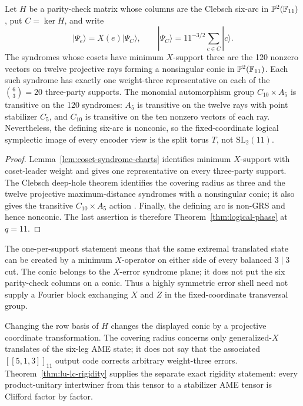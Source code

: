 \begin{proposition}
\label{prop:clebsch-x-syndrome}
Let \(H\) be a parity-check matrix whose columns are the Clebsch six-arc
in \(\mathbb P^2(\mathbb F_{11})\), put \(C=\ker H\), and write
\[
 |\Psi_e\rangle=X(e)|\Psi_C\rangle,
 \qquad
 |\Psi_C\rangle=11^{-3/2}\sum_{c\in C}|c\rangle .
\]
The syndromes whose cosets have minimum \(X\)-support three are the 120
nonzero vectors on twelve projective rays forming a nonsingular conic in
\(\mathbb P^2(\mathbb F_{11})\).  Each such syndrome has exactly one weight-three
representative on each of the \(\binom63=20\) three-party supports.  The
monomial automorphism group
\(C_{10}\times A_5\) is transitive on the 120 syndromes: \(A_5\) is
transitive on the twelve rays with point stabilizer \(C_5\), and
\(C_{10}\) is transitive on the ten nonzero vectors of each ray.
Nevertheless, the defining six-arc is nonconic, so the fixed-coordinate
logical symplectic image of every encoder view is the split torus \(T\),
not \(\mathrm{SL}_2(11)\).
\end{proposition}

\begin{proof}
Lemma~\ref{lem:coset-syndrome-charts} identifies minimum \(X\)-support
with coset-leader weight and gives one representative on every
three-party support.  The Clebsch deep-hole theorem identifies the covering
radius as three and the twelve projective maximum-distance syndromes with a
nonsingular conic; it also gives the transitive \(C_{10}\times A_5\) action
\cite[Proposition~6.2, Corollary~6.3, and Proposition~6.4]{RuddClebsch2026}.
Finally, the defining arc is non-GRS and hence nonconic.  The last assertion
is therefore Theorem~\ref{thm:logical-phase} at \(q=11\).
\end{proof}

\begin{remark}
\label{rem:clebsch-x-syndrome-boundary}
The one-per-support statement means that the same extremal translated state
can be created by a minimum \(X\)-operator on either side of every balanced
\(3\mid3\) cut.  The conic belongs to the \(X\)-error syndrome plane; it
does not put the six parity-check columns on a conic.  Thus a highly symmetric
error shell need not supply a Fourier block exchanging \(X\) and \(Z\) in the
fixed-coordinate transversal group.

Changing the row basis of \(H\) changes the displayed conic by a projective
coordinate transformation.  The covering radius concerns only
generalized-\(X\) translates of the six-leg AME state; it does not say that
the associated \([[5,1,3]]_{11}\) output code corrects arbitrary weight-three
errors.  Theorem~\ref{thm:lu-lc-rigidity} supplies the separate exact rigidity
statement: every product-unitary intertwiner from this tensor to a stabilizer
AME tensor is Clifford factor by factor.
\end{remark}

